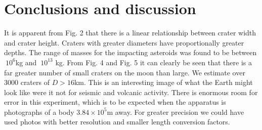 \documentclass{article}
\begin{document}
\section*{Conclusions and discussion}
It is apparent from Fig. 2 that there is a linear relationship between crater width and crater height. Craters with greater diameters have proportionally greater depths. The range of masses for the impacting asteroids was found to be between $~10^6$kg and $~10^{13}$ kg. From Fig. 4 and Fig. 5 it can clearly be seen that there is a far greater number of small craters on the moon than large. We estimate over 3000 craters of $D>16$km. This is an interesting image of what the Earth might look like were it not for seismic and volcanic activity. There is enormous room for error in this experiment, which is to be expected when the apparatus is photographs of a body $3.84 \times 10^5$m away. For greater precision we could have used photos with better resolution and smaller length conversion factors.
\end{document}
